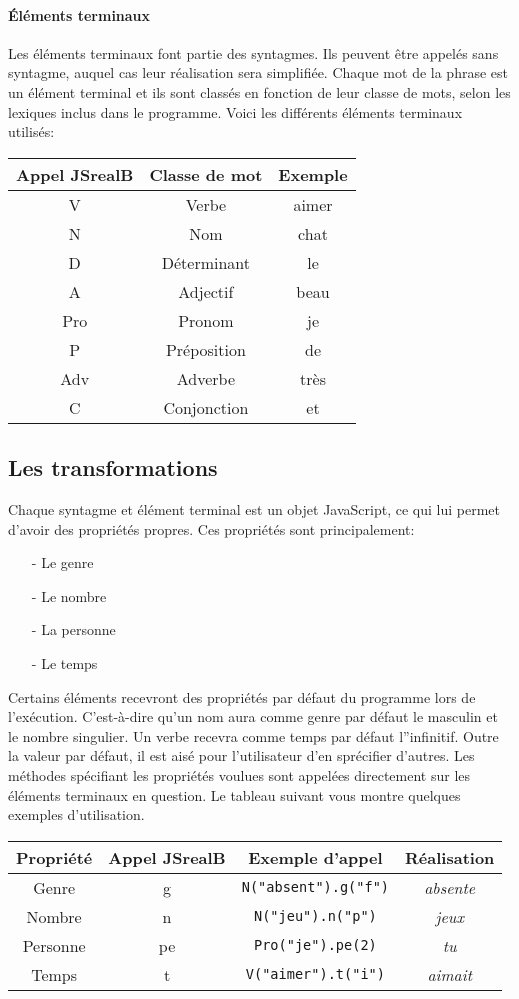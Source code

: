 \documentclass[11pt]{article} %
\newcommand{\real}[1]{\emph{#1}}
\begin{document}
\paragraph{Éléments terminaux}

Les éléments terminaux font partie des syntagmes. Ils peuvent être
appelés sans syntagme, auquel cas leur réalisation sera simplifiée.
Chaque mot de la phrase est un élément terminal et ils sont classés
en fonction de leur classe de mots, selon les lexiques inclus dans le
programme. Voici les différents éléments terminaux utilisés:

\begin{tabular}{|c|c|c|}
\hline 
Appel JSrealB & Classe de mot & Exemple\tabularnewline
\hline 
\hline 
V & Verbe & aimer\tabularnewline
\hline 
N & Nom & chat\tabularnewline
\hline 
D & Déterminant & le\tabularnewline
\hline 
A & Adjectif & beau\tabularnewline
\hline 
Pro & Pronom & je\tabularnewline
\hline 
P & Préposition & de\tabularnewline
\hline 
Adv & Adverbe & très\tabularnewline
\hline 
C & Conjonction & et\tabularnewline
\hline 
\end{tabular}

\subsection{Les transformations}

Chaque syntagme et élément terminal est un objet JavaScript, ce qui
lui permet d'avoir des propriétés propres. Ces propriétés sont principalement:
\begin{itemize}
\item[-] Le genre
\item[-] Le nombre
\item[-] La personne
\item[-] Le temps
\end{itemize}
Certains éléments recevront des propriétés par défaut du programme
lors de l'exécution. C'est-à-dire qu'un nom aura comme genre par défaut
le masculin et le nombre singulier. Un verbe recevra comme temps par
défaut l''infinitif. Outre la valeur par défaut, il est aisé pour
l'utilisateur d'en sprécifier d'autres. Les méthodes spécifiant les
propriétés voulues sont appelées directement sur les éléments terminaux
en question. Le tableau suivant vous montre quelques exemples d'utilisation.

\begin{tabular}{|c|c|c|c|}
\hline 
Propriété & Appel JSrealB & Exemple d'appel & Réalisation\tabularnewline
\hline 
\hline 
Genre & g & \texttt{N("absent").g("f")} & \real{absente}\tabularnewline
\hline 
Nombre & n & \texttt{N("jeu").n("p")} & \real{jeux}\tabularnewline
\hline 
Personne & pe & \texttt{Pro("je").pe(2)} & \real{tu}\tabularnewline
\hline 
Temps & t & \texttt{V("aimer").t("i")} & \real{aimait}\tabularnewline
\hline 
\end{tabular}
\end{document}
